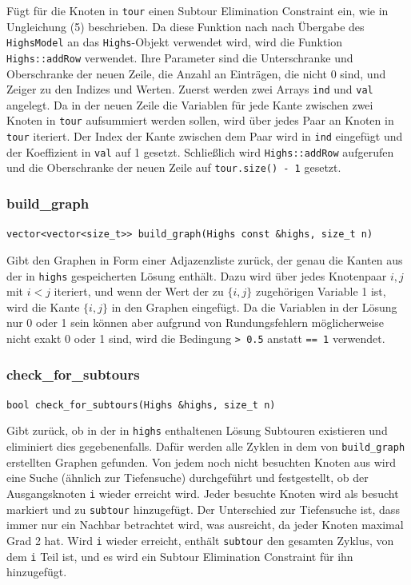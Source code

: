 \documentclass[a4paper, 10pt, ngerman]{article}
\begin{document}
\noindent Fügt für die Knoten in \verb|tour| einen Subtour Elimination Constraint ein, wie in Ungleichung (5) beschrieben. Da diese Funktion nach nach Übergabe des \verb|HighsModel| an das \verb|Highs|-Objekt verwendet wird, wird die Funktion \verb|Highs::addRow| verwendet. Ihre Parameter sind die Unterschranke und Oberschranke der neuen Zeile, die Anzahl an Einträgen, die nicht 0 sind, und Zeiger zu den Indizes und Werten. Zuerst werden zwei Arrays \verb|ind| und \verb|val| angelegt. Da in der neuen Zeile die Variablen für jede Kante zwischen zwei Knoten in \verb|tour| aufsummiert werden sollen, wird über jedes Paar an Knoten in \verb|tour| iteriert. Der Index der Kante zwischen dem Paar wird in \verb|ind| eingefügt und der Koeffizient in \verb|val| auf 1 gesetzt. Schließlich wird \verb|Highs::addRow| aufgerufen und die Oberschranke der neuen Zeile auf \verb|tour.size() - 1| gesetzt.

\subsubsection{build\_graph}
\verb|vector<vector<size_t>> build_graph(Highs const &highs, size_t n)|
\medskip

\noindent Gibt den Graphen in Form einer Adjazenzliste zurück, der genau die Kanten aus der in \verb|highs| gespeicherten Lösung enthält. Dazu wird über jedes Knotenpaar $i, j$ mit $i < j$ iteriert, und wenn der Wert der zu $\{i, j\}$ zugehörigen Variable 1 ist, wird die Kante $\{i, j\}$ in den Graphen eingefügt. Da die Variablen in der Lösung nur 0 oder 1 sein können aber aufgrund von Rundungsfehlern möglicherweise nicht exakt 0 oder 1 sind, wird die Bedingung \verb|> 0.5| anstatt \verb|== 1| verwendet.

\subsubsection{check\_for\_subtours}
\verb|bool check_for_subtours(Highs &highs, size_t n)|
\medskip

\noindent Gibt zurück, ob in der in \verb|highs| enthaltenen Lösung Subtouren existieren und eliminiert dies gegebenenfalls. Dafür werden alle Zyklen in dem von \verb|build_graph| erstellten Graphen gefunden. Von jedem noch nicht besuchten Knoten aus wird eine Suche (ähnlich zur Tiefensuche) durchgeführt und festgestellt, ob der Ausgangsknoten \verb|i| wieder erreicht wird. Jeder besuchte Knoten wird als besucht markiert und zu \verb|subtour| hinzugefügt. Der Unterschied zur Tiefensuche ist, dass immer nur ein Nachbar betrachtet wird, was ausreicht, da jeder Knoten maximal Grad 2 hat. Wird \verb|i| wieder erreicht, enthält \verb|subtour| den gesamten Zyklus, von dem \verb|i| Teil ist, und es wird ein Subtour Elimination Constraint für ihn hinzugefügt.
\end{document}
